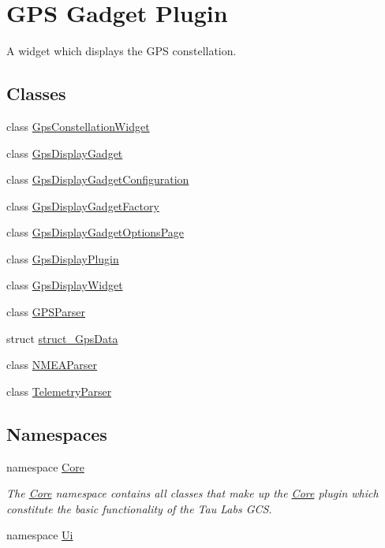\hypertarget{group___g_p_s_gadget_plugin}{\section{\-G\-P\-S \-Gadget \-Plugin}
\label{group___g_p_s_gadget_plugin}
}


\-A widget which displays the \-G\-P\-S constellation.  


\subsection*{\-Classes}
\begin{DoxyCompactItemize}
\item 
class \hyperlink{class_gps_constellation_widget}{\-Gps\-Constellation\-Widget}
\item 
class \hyperlink{class_gps_display_gadget}{\-Gps\-Display\-Gadget}
\item 
class \hyperlink{class_gps_display_gadget_configuration}{\-Gps\-Display\-Gadget\-Configuration}
\item 
class \hyperlink{class_gps_display_gadget_factory}{\-Gps\-Display\-Gadget\-Factory}
\item 
class \hyperlink{class_gps_display_gadget_options_page}{\-Gps\-Display\-Gadget\-Options\-Page}
\item 
class \hyperlink{class_gps_display_plugin}{\-Gps\-Display\-Plugin}
\item 
class \hyperlink{class_gps_display_widget}{\-Gps\-Display\-Widget}
\item 
class \hyperlink{class_g_p_s_parser}{\-G\-P\-S\-Parser}
\item 
struct \hyperlink{structstruct___gps_data}{struct\-\_\-\-Gps\-Data}
\item 
class \hyperlink{class_n_m_e_a_parser}{\-N\-M\-E\-A\-Parser}
\item 
class \hyperlink{class_telemetry_parser}{\-Telemetry\-Parser}
\end{DoxyCompactItemize}
\subsection*{\-Namespaces}
\begin{DoxyCompactItemize}
\item 
namespace \hyperlink{namespace_core}{\-Core}
\begin{DoxyCompactList}\small\item\em \-The \hyperlink{namespace_core}{\-Core} namespace contains all classes that make up the \hyperlink{namespace_core}{\-Core} plugin which constitute the basic functionality of the \-Tau \-Labs \-G\-C\-S. \end{DoxyCompactList}\item 
namespace \hyperlink{namespace_ui}{\-Ui}
\end{DoxyCompactItemize}
